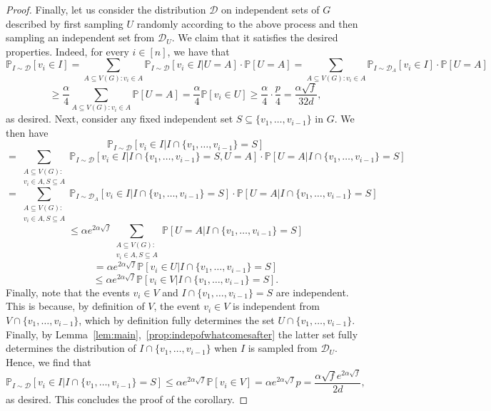 \documentclass[10pt,a4paper]{amsart}
\begin{document}
\begin{proof}
    Finally, let us consider the distribution $\mathcal{D}$ on independent sets of $G$ described by first sampling $U$ randomly according to the above process and then sampling an independent set from $\mathcal{D}_U$. We claim that it satisfies the desired properties. Indeed, for every $i\in [n]$, we have that
    $$\mathbb{P}_{I\sim \mathcal{D}}[v_i\in I]=\sum_{A\subseteq V(G):v_i\in A}\mathbb{P}_{I\sim \mathcal{D}}[v_i\in I|U=A]\cdot\mathbb{P}[U=A]=\sum_{A\subseteq V(G):v_i\in A}\mathbb{P}_{I\sim \mathcal{D}_A}[v_i\in I]\cdot\mathbb{P}[U=A]$$
    $$\ge \frac{\alpha}{4}\sum_{A\subseteq V(G): v_i\in A}\mathbb{P}[U=A]=\frac{\alpha}{4}\mathbb{P}[v_i\in U]\ge \frac{\alpha}{4}\cdot \frac{p}{4}=\frac{\alpha\sqrt{f}}{32d},$$ as desired. Next, consider any fixed independent set $S\subseteq \{v_1,\ldots,v_{i-1}\}$ in $G$. 
    We then have
    $$\mathbb{P}_{I\sim \mathcal{D}}[v_i\in I|I\cap \{v_1,\ldots,v_{i-1}\}=S]$$ $$=\sum_{\substack{A\subseteq V(G):\\ v_i\in A, S\subseteq A}}\mathbb{P}_{I\sim \mathcal{D}}[v_i\in I|I\cap \{v_1,\ldots,v_{i-1}\}=S, U=A]\cdot\mathbb{P}[U=A|I\cap \{v_1,\ldots,v_{i-1}\}=S]$$
    $$=\sum_{\substack{A\subseteq V(G):\\ v_i\in A, S\subseteq A}}\mathbb{P}_{I\sim \mathcal{D}_A}[v_i\in I|I\cap \{v_1,\ldots,v_{i-1}\}=S]\cdot\mathbb{P}[U=A|I\cap \{v_1,\ldots,v_{i-1}\}=S]$$
    $$\le \alpha e^{2\alpha\sqrt{f}}\sum_{\substack{A\subseteq V(G):\\ v_i\in A, S\subseteq A}}\mathbb{P}[U=A|I\cap \{v_1,\ldots,v_{i-1}\}=S]$$
    $$=\alpha e^{2\alpha\sqrt{f}} \mathbb{P}[v_i\in U|I\cap \{v_1,\ldots,v_{i-1}\}=S]$$
    $$\le \alpha e^{2\alpha\sqrt{f}} \mathbb{P}[v_i\in V|I\cap \{v_1,\ldots,v_{i-1}\}=S].$$
    Finally, note that the events $v_i\in V$ and $I\cap \{v_1,\ldots,v_{i-1}\}=S$ are independent. This is because, by definition of $V$, the event $v_i\in V$ is independent from $V\cap \{v_1,\ldots,v_{i-1}\}$, which by definition fully determines the set $U\cap \{v_1,\ldots,v_{i-1}\}$. Finally, by Lemma~\ref{lem:main},~\ref{prop:indepofwhatcomesafter} the latter set fully determines the distribution of $I\cap \{v_1,\ldots,v_{i-1}\}$ when $I$ is sampled from $\mathcal{D}_U$. Hence, we find that $$\mathbb{P}_{I\sim \mathcal{D}}[v_i\in I|I\cap\{v_1,\ldots,v_{i-1}\}=S]\le \alpha e^{2\alpha\sqrt{f}}\mathbb{P}[v_i\in V]=\alpha e^{2\alpha\sqrt{f}}p=\frac{\alpha\sqrt{f} e^{2\alpha\sqrt{f}}}{2d},$$ as desired. This concludes the proof of the corollary.
    \end{proof}
\end{document}

